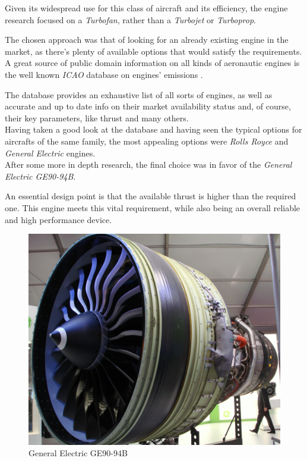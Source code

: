 \documentclass{article}
\begin{document}
Given its widespread use for this class of aircraft and its efficiency, the engine research focused on a 
\textit{Turbofan}, rather than a \textit{Turbojet} or \textit{Turboprop}. 

The chosen approach was that of looking for an already existing engine in the market, as there's plenty of available
options that would satisfy the requirements. \\ 

A great source of public domain information on all kinds of aeronautic engines is the well known \textit{ICAO}
database on engines' emissions \autocite{ICAO_engine_database}.

The database provides an exhaustive list of all sorts of engines, as well as accurate and up to date info on their market availability
status and, of course, their key parameters, like thrust and many others. \\ 

Having taken a good look at the database and having seen the typical options for aircrafts of the same family,
the most appealing options were \textit{Rolls Royce} and \textit{General Electric} engines. \\ 

After some more in depth research, the final choice was in favor of the \textit{General Electric GE90-94B}. 

An essential design point is that the available thrust is higher than the required one. 
This engine meets this vital requirement, while also being an overall reliable and high performance device. 


\clearpage

\begin{figure}[h!]
    \centering
    \includegraphics[width=\textwidth]{Sources/Plots_and_Pictures/engine.jpeg}
    \caption{General Electric GE90-94B \autocite{ge90}}
    \label{General_electric}
\end{figure}
\end{document}
